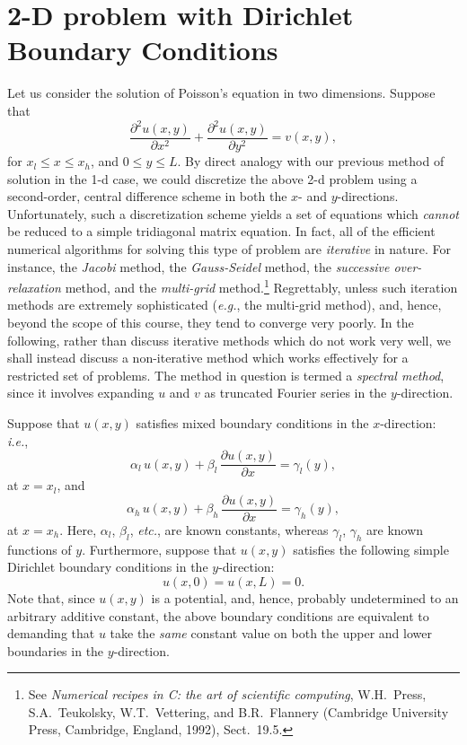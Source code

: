 \section{2-D problem with Dirichlet Boundary Conditions}\label{fftsine}
 Let us consider the solution of Poisson's equation
in two dimensions. Suppose that
\begin{equation}\label{e541}
\frac{\partial^2 u(x,y)}{\partial x^2}+\frac{\partial^2 u(x,y)}{\partial y^2} = v(x,y),
\end{equation}
for $x_l\leq x \leq x_h$, and $0\leq y \leq L$. By direct analogy
with our previous method of solution in the 1-d case, we could discretize
the above 2-d problem  using a second-order, central difference scheme in both
the $x$- and $y$-directions. Unfortunately, such a discretization scheme yields a
set of equations which {\em cannot} be reduced to a simple tridiagonal matrix equation.
In fact, all of the efficient numerical algorithms for solving this type of problem are
{\em iterative} in nature. For instance, the {\em Jacobi} method, the
{\em Gauss-Seidel} method, the {\em successive over-relaxation} method, and the {\em multi-grid}
method.\footnote{See {\em Numerical recipes in C: the
art of scientific computing}, W.H.~Press, S.A.~Teukolsky, W.T.~Vettering, and
B.R.~Flannery (Cambridge University Press, Cambridge, England, 1992), Sect.~19.5.}
Regrettably, unless such iteration methods are extremely sophisticated ({\em e.g.}, the multi-grid method),
 and, hence,
beyond the scope of this course,
 they tend to converge very poorly. In the following, 
rather than discuss iterative methods which do not work
very well, we shall instead discuss a non-iterative method which works effectively
for a restricted set of problems. The method in question is termed a {\em spectral method}, since
it involves expanding $u$ and $v$ as truncated Fourier series in the $y$-direction.

Suppose that $u(x,y)$ satisfies mixed   boundary conditions in the $x$-direction: {\em i.e.},
\begin{equation}\label{e527a}
\alpha_l\,u(x,y) + \beta_l\,\frac{\partial u(x,y)}{\partial x} = \gamma_l(y),
\end{equation}
at $x=x_l$, and
\begin{equation}\label{e528a}
\alpha_h \,u(x,y)+ \beta_h\,\frac{\partial u(x,y)}{\partial x} = \gamma_h(y),
\end{equation}
at $x=x_h$. Here, $\alpha_l$, $\beta_l$, {\em etc.}, are known constants,
whereas $\gamma_l$, $\gamma_h$ are known functions of $y$. 
Furthermore, suppose that $u(x,y)$ satisfies the following simple Dirichlet boundary
conditions in the $y$-direction:
\begin{equation}\label{e5.44}
u(x,0) = u(x,L) = 0.
\end{equation}
Note that, since $u(x,y)$ is a potential, and, hence, probably undetermined to an
arbitrary additive constant, the above boundary conditions are equivalent to
demanding that $u$ take the
{\em same} constant value on both the upper and lower boundaries in the $y$-direction.

